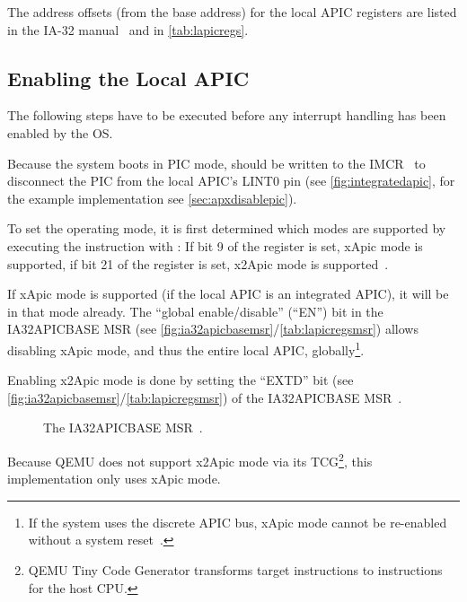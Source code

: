 The address offsets (from the base address) for the local APIC registers are listed in the IA-32
manual~\cite[sec.~3.11.4.1]{ia32} and in \autoref{tab:lapicregs}.

\subsection{Enabling the Local APIC}
\label{subsec:lapicenable}

The following steps have to be executed before any interrupt handling has been enabled by the OS\@.

Because the system boots in PIC mode,  should be written to the
IMCR~\cite[sec.~3.6.2.1]{mpspec} to disconnect the PIC from the local APIC's LINT0 pin (see
\autoref{fig:integratedapic}, for the example implementation see \autoref{sec:apxdisablepic}).

To set the operating mode, it is first determined which modes are supported by executing the
 instruction with : If bit 9 of the  register is set, xApic mode
is supported, if bit 21 of the  register is set, x2Apic mode is
supported~\cite[sec.~5.1.2]{cpuid}.

If xApic mode is supported (if the local APIC is an integrated APIC), it will be in that mode
already. The ``global enable/disable'' (``EN'') bit in the
IA32\textunderscore{}APIC\textunderscore{}BASE MSR (see
\autoref{fig:ia32apicbasemsr}/\autoref{tab:lapicregsmsr}) allows disabling xApic mode, and thus the
entire local APIC, globally\footnote{If the system uses the discrete APIC bus, xApic mode cannot be
  re-enabled without a system reset~\cite[sec.~3.11.4.3]{ia32}.}.

Enabling x2Apic mode is done by setting the ``EXTD'' bit (see
\autoref{fig:ia32apicbasemsr}/\autoref{tab:lapicregsmsr}) of the
IA32\textunderscore{}APIC\textunderscore{}BASE MSR~\cite[sec.~3.11.4.3]{ia32}.

\begin{figure}[h]
  \centering
  \begin{subfigure}[b]{0.7\textwidth}
    
  \end{subfigure}
  \caption{The IA32\textunderscore{}APIC\textunderscore{}BASE MSR~\cite[sec.~3.11.4.4]{ia32}.}
  \label{fig:ia32apicbasemsr}
\end{figure}

Because QEMU does not support x2Apic mode via its TCG\footnote{QEMU Tiny Code Generator transforms
  target instructions to instructions for the host CPU.}, this implementation only uses xApic mode.

